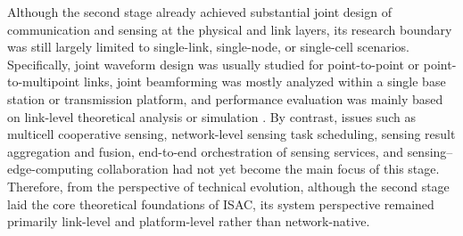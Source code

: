 Although the second stage already achieved substantial joint design of communication and sensing at the physical and link layers, its research boundary was still largely limited to single-link, single-node, or single-cell scenarios. Specifically, joint waveform design was usually studied for point-to-point or point-to-multipoint links, joint beamforming was mostly analyzed within a single base station or transmission platform, and performance evaluation was mainly based on link-level theoretical analysis or simulation \cite{Liu2020JointRadarComm,Liu2022ISAC}. By contrast, issues such as multicell cooperative sensing, network-level sensing task scheduling, sensing result aggregation and fusion, end-to-end orchestration of sensing services, and sensing--edge-computing collaboration had not yet become the main focus of this stage. Therefore, from the perspective of technical evolution, although the second stage laid the core theoretical foundations of ISAC, its system perspective remained primarily link-level and platform-level rather than network-native.

